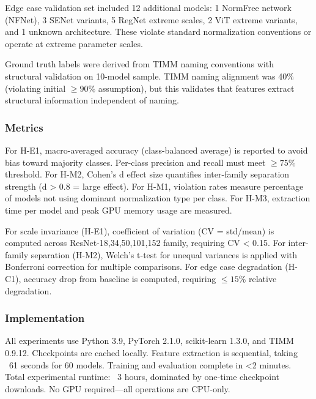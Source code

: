 Edge case validation set included 12 additional models: 1 NormFree network (NFNet), 3 SENet variants, 5 RegNet extreme scales, 2 ViT extreme variants, and 1 unknown architecture. These violate standard normalization conventions or operate at extreme parameter scales.

Ground truth labels were derived from TIMM naming conventions with structural validation on 10-model sample. TIMM naming alignment was 40\% (violating initial $\geq 90$\% assumption), but this validates that features extract structural information independent of naming.

\subsubsection{Metrics}

For H-E1, macro-averaged accuracy (class-balanced average) is reported to avoid bias toward majority classes. Per-class precision and recall must meet $\geq 75$\% threshold. For H-M2, Cohen's d effect size quantifies inter-family separation strength (d > 0.8 = large effect). For H-M1, violation rates measure percentage of models not using dominant normalization type per class. For H-M3, extraction time per model and peak GPU memory usage are measured.

For scale invariance (H-E1), coefficient of variation (CV = std/mean) is computed across ResNet-{18,34,50,101,152} family, requiring CV < 0.15. For inter-family separation (H-M2), Welch's t-test for unequal variances is applied with Bonferroni correction for multiple comparisons. For edge case degradation (H-C1), accuracy drop from baseline is computed, requiring $\leq 15$\% relative degradation.

\subsubsection{Implementation}

All experiments use Python 3.9, PyTorch 2.1.0, scikit-learn 1.3.0, and TIMM 0.9.12. Checkpoints are cached locally. Feature extraction is sequential, taking ~61 seconds for 60 models. Training and evaluation complete in <2 minutes. Total experimental runtime: ~3 hours, dominated by one-time checkpoint downloads. No GPU required---all operations are CPU-only.

